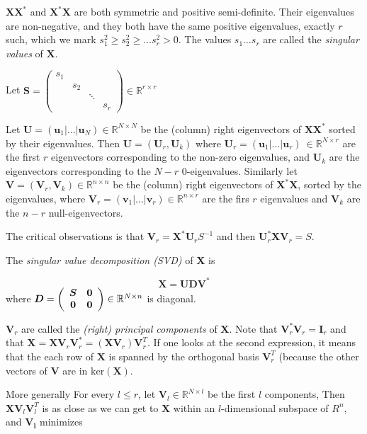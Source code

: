 \documentclass[11pt, a4paper]{report}
\theoremstyle{plain}
\theoremstyle{definition}
\theoremstyle{remark}
\newcommand{\R}{\mathbb{R}}
\newcommand{\X}{\mathbf{X}}
\newcommand{\bv}[1]{\boldsymbol{#1}}
\newcommand{\gt}{>}
\begin{document}
$\X \X^*$ and $\X^* \X$ are both symmetric and positive semi-definite.
Their eigenvalues are non-negative, and they both have
the same positive 
eigenvalues, exactly $r$ such, which we mark
$s_1^2 \geq s_2^2 \geq \dots s_r^2 \gt 0$. The values
$s_1 \dots s_r$ are called the \emph{singular values} of $\bv{X}$.

Let $\bv{S} = 
\begin{pmatrix}
s_1 & & &\\
& s_2 & &\\
& & \ddots &\\
& & & s_r
\end{pmatrix} \in \R^{r \times r}
$

Let $\bv{U} = (\bv{u}_1 | \dots | \bv{u}_N) \in \R^{N \times N}$
be the (column) right eigenvectors of $\X \X^*$ sorted
by their eigenvalues. 
Then $\bv{U} = (\bv{U}_r, \bv{U}_k)$ 
where $\bv{U}_r = (\bv{u}_1 | \dots | \bv{u}_r) \ \in \R^{N \times r}$ are the first $r$
eigenvectors corresponding to the non-zero eigenvalues, and $\bv{U}_k$ are the
eigenvectors corresponding to the $N-r$ $0$-eigenvalues.
Similarly let 
$\bv{V}  = (\bv{V}_r, \bv{V}_k)\in \R^{n \times n}$
be the (column) right eigenvectors of $\X^* \X$, sorted
by the eigenvalues, 
where $\bv{V}_r  = (\bv{v}_1 | \dots | \bv{v}_r) \in \R^{n \times r}$ are the firs $r$
eigenvalues and $\bv{V}_k$ are the $n-r$ null-eigenvectors.

The critical observations is that $\bv{V}_r = \bv{X}^* \bv{U}_r S^{-1}$
and then $\bv{U}_r^* \X \bv{V}_r = S$.

The \textit{singular value decomposition (SVD)} of $\X$ is 

\begin{equation}
\label{eq:svd}
\X = \bv{U} \bv{D} \bv{V}^*
\end{equation}
where 
$\bv{D} =
\left(
\begin{array}{c c}
\bv{S} & \bv{0} \\
\bv{0} & \bv{0}
\end{array}
\right) \in \R^{N \times n}
$ is diagonal.

$\bv{V}_r$ are called the \textit{(right) principal components} of $\X$.
Note that $\bv{V}_r^* \bv{V}_r = \bv{I}_r$ and that 
$\X = \X \bv{V}_r \bv{V}_r^* = (\X \bv{V}_r) \bv{V}_r^T$. If one looks at the second expression, 
it means that the each row of $\X$ is spanned by the orthogonal
basis $\bv{V}_r^T$ (because the other vectors of $\bv{V}$ are in $\text{ker}(\X)$.

More generally
For every $l \leq r$, let $\bv{V}_l \in \R^{N \times l}$ be the first $l$ components,
Then $\X\bv{V}_l \bv{V}_l^T$ is as close as we can get to $\X$ within an
$l$-dimensional subspace of $R^n$, and $\bv{V_l}$ minimizes
\end{document}
